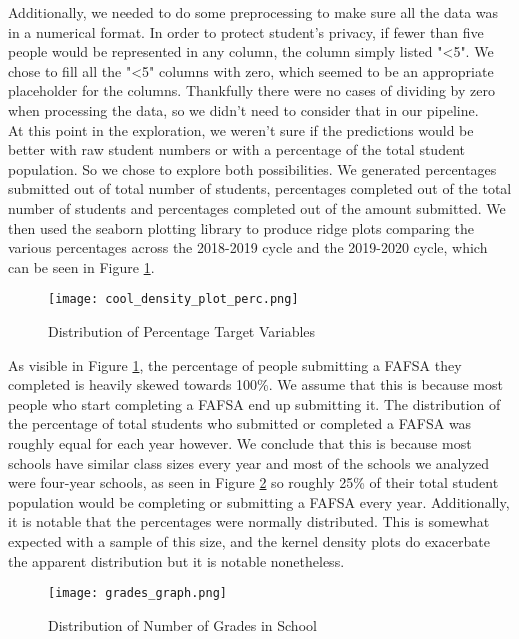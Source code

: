 \documentclass[12pt]{article}
\begin{document}
Additionally, we needed to do some preprocessing to make sure all the data was
in a numerical format. In order to protect student's privacy, if fewer than five
people would be represented in any column, the column simply listed "<5". We chose
to fill all the "<5" columns with zero, which seemed to be an appropriate placeholder
for the columns. Thankfully there were no cases of dividing by zero when processing
the data, so we didn't need to consider that in our pipeline.\\

At this point in the exploration, we weren't sure if the predictions would be better
with raw student numbers or with a percentage of the total student population.
So we chose to explore both possibilities. We generated percentages submitted out of
total number of students, percentages completed out of the total number of students
and percentages completed out of the amount submitted. We then used the seaborn
plotting library to produce ridge plots comparing the various percentages across the 
2018-2019 cycle and the 2019-2020 cycle, which can be seen in Figure 
\ref{fig:target_perc}. \cite{snsridgeplot2019} \\

\begin{figure}[!htb]
  \centering
  \texttt{[image: cool\_density\_plot\_perc.png]}
  \caption{Distribution of Percentage Target Variables}
  \label{fig:target_perc}
\end{figure}

As visible in Figure \ref{fig:target_perc}, the percentage of people submitting a 
FAFSA they completed is heavily skewed towards 100\%. We assume that this is 
because most people who start completing a FAFSA end up submitting it. The distribution
of the percentage of total students who submitted or completed a FAFSA was roughly
equal for each year however. We conclude that this is because most schools have similar
class sizes every year and most of the schools we analyzed were four-year schools, 
as seen in Figure \ref{fig:grades} so roughly 25\% of their total student population would be 
completing or submitting a FAFSA every year. Additionally, it is notable that the percentages 
were normally distributed. This is somewhat expected with a sample of this size, and the 
kernel density plots do exacerbate the apparent distribution but it is notable nonetheless.\\

\begin{figure}[!htb]
  \centering
  \texttt{[image: grades\_graph.png]}
  \caption{Distribution of Number of Grades in School}
  \label{fig:grades}
\end{figure}
\end{document}
